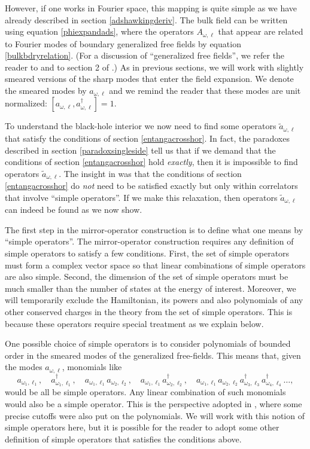 \documentclass[12pt]{article}
\newcommand{\cop}[1]{#1}
\def\ta{\widetilde{\cop{a}}}
\begin{document}
However, if one works in Fourier space, this mapping  is quite simple as we have already described in section \ref{adshawkingderiv}. The bulk field can be written using equation \eqref{phiexpandads}, where the operators $A_{\omega, \ell}$ that appear are related to Fourier modes of boundary generalized free fields by equation \eqref{bulkbdryrelation}. (For a discussion of ``generalized free fields'', we refer the reader to \cite{ElShowk:2011ag} and to section 2 of \cite{Papadodimas:2012aq}.)  As in previous sections,  we will work with slightly smeared versions of the sharp modes that enter the field expansion. We denote the smeared modes by $a_{\omega, \ell}$ and we remind the reader that these modes are unit normalized: $[a_{\omega, \ell}, a_{\omega, \ell}^{\dagger}] = 1$.

To understand the black-hole interior we now need to find some operators $\ta_{\omega, \ell}$ that satisfy the conditions of section \ref{entangacrosshor}. In fact, the paradoxes described in section \ref{paradoxsingleside} tell us that if we demand that the conditions of section \ref{entangacrosshor} hold {\em exactly}, then it is impossible to find operators $\ta_{\omega, \ell}$. The insight in \cite{Papadodimas:2013jku} was that the conditions of section \ref{entangacrosshor} do {\em not} need to be satisfied exactly but only within  correlators that involve ``simple operators''. If we make this relaxation, then operators $\ta_{\omega, \ell}$ can indeed be found as we now show.

The first step in the  mirror-operator construction is to define what one means by  ``simple operators''.   The mirror-operator construction requires any definition of simple operators to satisfy a few conditions.  First, the set of simple operators must form a complex vector space so that linear combinations of simple operators are also simple. Second, the dimension of the set of simple operators must be much smaller than the number of states at the energy of interest.  Moreover, we will temporarily exclude the Hamiltonian, its powers and also polynomials of any other conserved charges in the theory from the set of simple operators. This is because these operators require special treatment as we explain below. 

One possible choice of simple operators is to consider polynomials of bounded order in the smeared modes of the generalized free-fields. This means that, given the modes $a_{\omega, \ell}$, monomials like
\[
a_{\omega_1, \ell_1}, \quad a_{\omega_1, \ell_1}^{\dagger}, \quad a_{\omega_1, \ell_1} a_{\omega_2, \ell_2}, \quad a_{\omega_1, \ell_1} a_{\omega_2, \ell_2}^{\dagger}, \quad a_{\omega_1, \ell_1} a_{\omega_2, \ell_2} a_{\omega_3, \ell_3}^{\dagger} a_{\omega_4, \ell_4}^{\dagger} \ldots,
\]
would be all be simple operators. Any linear combination of such monomials would also be a simple operator.  This is the perspective adopted in \cite{Papadodimas:2013jku}, where some precise cutoffs were also put on the polynomials.  We will work with this notion of simple operators here, but it is possible for the reader to adopt some other definition of simple operators that satisfies the conditions above.
\end{document}

